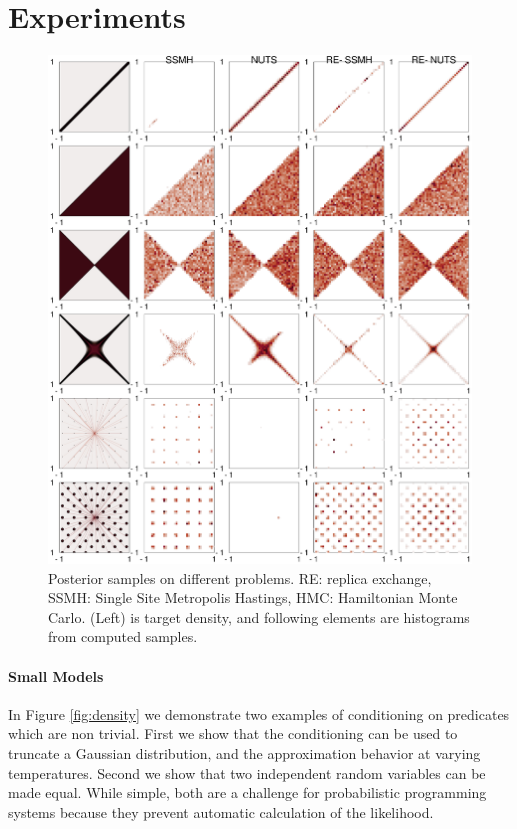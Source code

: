 
\section{Experiments}

\begin{figure}
	\includegraphics[width=\linewidth]{grid3}
	\caption{Posterior samples on different problems.  RE: replica exchange, SSMH: Single Site Metropolis Hastings, HMC: Hamiltonian Monte Carlo.  (Left) is target density, and following elements are histograms from computed samples.}
	\label{fig:grid}
\end{figure}
	


\paragraph{Small Models}
In Figure \ref{fig:density} we demonstrate two examples of conditioning on predicates which are non trivial.
First we show that the conditioning can be used to truncate a Gaussian distribution, and the approximation behavior at varying temperatures.  Second we show that two independent random variables can be made equal.  While simple, both are a challenge for probabilistic programming systems because they prevent automatic calculation of the likelihood.

